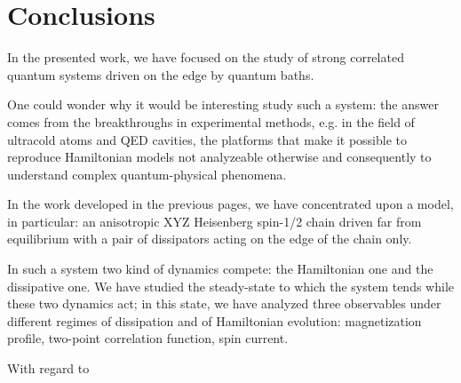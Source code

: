 \chapter*{Conclusions}

\label{Conclusions}

In the presented work, we have focused on the study of strong correlated quantum systems driven on the edge by quantum baths. %

One could wonder why it would be interesting study such a system: the answer comes from the breakthroughs in  experimental methods, e.g. in the field of ultracold atoms and QED cavities, the platforms that make it possible to reproduce Hamiltonian models not analyzeable otherwise and consequently to understand complex quantum-physical phenomena. 

In the work developed in the previous pages, we have concentrated upon a model, in particular: an anisotropic XYZ Heisenberg spin-1/2 chain driven far from equilibrium with a pair of dissipators acting on the edge of the chain only.

In such a system two kind of dynamics compete: the Hamiltonian one and the dissipative one. We have studied the steady-state to which the system tends while these two dynamics act; in this state, we have analyzed three observables under different regimes of dissipation and of Hamiltonian evolution: magnetization profile, two-point correlation function, spin current.

With regard to 



